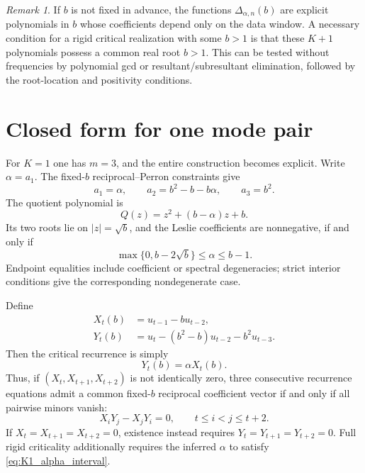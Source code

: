 \documentclass[11pt]{amsart}
\numberwithin{equation}{section}
\theoremstyle{plain}
\theoremstyle{definition}
\theoremstyle{remark}
\newtheorem{remark}[theorem]{Remark}
\begin{document}
\begin{remark}
\label{rem:unknown_b_elimination}
If $b$ is not fixed in advance, the functions $\Delta_{\alpha,n}(b)$ are explicit polynomials in $b$ whose coefficients depend only on the data window.  A necessary condition for a rigid critical realization with some $b>1$ is that these $K+1$ polynomials possess a common real root $b>1$.  This can be tested without frequencies by polynomial gcd or resultant/subresultant elimination, followed by the root-location and positivity conditions.
\end{remark}

\section{Closed form for one mode pair}
\label{sec:K1_closed_form}

For $K=1$ one has $m=3$, and the entire construction becomes explicit.  Write $\alpha=a_1$.  The fixed-$b$ reciprocal--Perron constraints give
\begin{equation}
\boxed{
 a_1=\alpha,
 \qquad
 a_2=b^2-b-b\alpha,
 \qquad
 a_3=b^2.
}
\label{eq:K1_coefficients}
\end{equation}
The quotient polynomial is
\begin{equation}
Q(z)=z^2+(b-\alpha)z+b.
\label{eq:K1_quotient}
\end{equation}
Its two roots lie on $|z|=\sqrt b$, and the Leslie coefficients are nonnegative, if and only if
\begin{equation}
\boxed{
\max\{0,b-2\sqrt b\}
\leq\alpha\leq b-1.
}
\label{eq:K1_alpha_interval}
\end{equation}
Endpoint equalities include coefficient or spectral degeneracies; strict interior conditions give the corresponding nondegenerate case.

Define
\begin{align}
X_t(b)&=u_{t-1}-bu_{t-2},
\label{eq:K1_X}\\
Y_t(b)&=u_t-(b^2-b)u_{t-2}-b^2u_{t-3}.
\label{eq:K1_Y}
\end{align}
Then the critical recurrence is simply
\begin{equation}
Y_t(b)=\alpha X_t(b).
\label{eq:K1_rank_one_relation}
\end{equation}
Thus, if $(X_t,X_{t+1},X_{t+2})$ is not identically zero, three consecutive recurrence equations admit a common fixed-$b$ reciprocal coefficient vector if and only if all pairwise minors vanish:
\begin{equation}
X_iY_j-X_jY_i=0,
\qquad
t\leq i<j\leq t+2.
\label{eq:K1_data_identities}
\end{equation}
If $X_t=X_{t+1}=X_{t+2}=0$, existence instead requires $Y_t=Y_{t+1}=Y_{t+2}=0$.  Full rigid criticality additionally requires the inferred $\alpha$ to satisfy \eqref{eq:K1_alpha_interval}.
\end{document}
